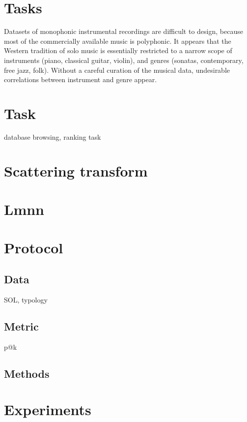\documentclass{article}
\begin{document}
\section{Tasks}

Datasets of monophonic instrumental recordings are difficult to design, because most of the commercially available music is polyphonic.
It appears that the Western tradition of solo music is essentially restricted to a narrow scope of instruments (piano, classical guitar, violin), and genres (sonatas, contemporary, free jazz, folk).
Without a careful curation of the musical data, undesirable correlations between instrument and genre appear.



\section{Task}

database browsing, ranking task



\section{Scattering transform}



\section{Lmnn}

\section{Protocol}

\subsection{Data}

SOL, typology

\subsection{Metric}

p@k

\subsection{Methods}


\section{Experiments}










\end{document}
